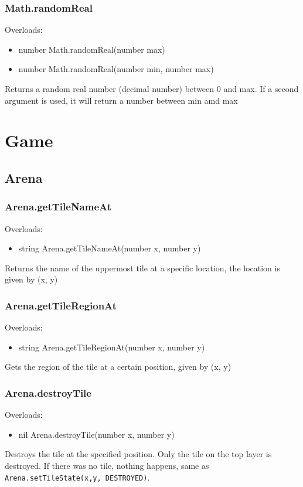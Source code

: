 \documentclass{book}
\newenvironment{ulist}
	{\begin{itemize}
			\itemsep0em}
	{\end{itemize}}
\begin{document}
\subsubsection{Math.randomReal}
Overloads:
\begin{ulist}
	\item number Math.randomReal(number max)
	\item number Math.randomReal(number min, number max)
\end{ulist}
Returns a random real number (decimal number) between 0 and max.
If a second argument is used, it will return a number between min amd max



\section{Game}
\subsection{Arena}
\subsubsection{Arena.getTileNameAt}
Overloads:
\begin{ulist}
	\item string Arena.getTileNameAt(number x, number y)
\end{ulist}
Returns the name of the uppermost tile at a specific location, the location is given by (x, y)

\subsubsection{Arena.getTileRegionAt}
Overloads:
\begin{ulist}
	\item string Arena.getTileRegionAt(number x, number y)
\end{ulist}
Gets the region of the tile at a certain position, given by (x, y)

\subsubsection{Arena.destroyTile}
Overloads:
\begin{ulist}
	\item nil Arena.destroyTile(number x, number y)
\end{ulist}
Destroys the tile at the specified position. Only the tile on the top layer is destroyed. If there was no tile, nothing happens, same as \texttt{Arena.setTileState(x,y, DESTROYED)}.
\end{document}
